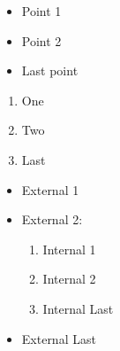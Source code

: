 \documentclass{article}
\begin{document}
	
     \begin{itemize}
	\item Point 1\autopunct
	\item Point 2\autopunct
	\item Last point\autopunct
\end{itemize}


\begin{enumerate}
	\item One\autopunct
	\item Two\autopunct
	\item Last\autopunct
\end{enumerate}


\begin{itemize}
	\item External 1\autopunct
	\item External 2:\autopunct
	\begin{enumerate}
		\item Internal 1\autopunct
		\item Internal 2\autopunct
		\item Internal Last\autopunct
	\end{enumerate}
	\item External Last\autopunct
\end{itemize}
\end{document}
